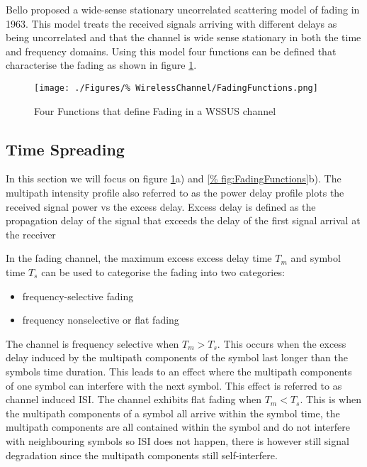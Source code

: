 Bello \cite{Bello63} proposed a wide-sense %
stationary uncorrelated scattering model of fading in %
1963. This model treats the received signals arriving %
with different delays as being uncorrelated and that %
the channel is wide sense stationary in both the time %
and frequency domains. Using this model four functions %
can be defined that characterise the fading as shown in %
figure \ref{fig:FadingFunctions}.
\begin{figure}[ht]
	\centering
	\texttt{[image: ./Figures/\%
		WirelessChannel/FadingFunctions.png]}
	\caption{Four Functions that define Fading in %
			a WSSUS channel %
		   }
	\label{fig:FadingFunctions}
\end{figure}

\FloatBarrier
\subsection{Time Spreading}
In this section we will focus on figure %
\ref{fig:FadingFunctions}a) and \ref{%
fig:FadingFunctions}b). The multipath %
intensity profile also referred to as the %
power delay profile plots the received %
signal power vs the excess delay. %
Excess delay is defined as the propagation %
delay of the signal that exceeds the delay %
of the first signal arrival at the receiver %

In the fading channel, the maximum excess %
excess delay time $T_{m}$ and symbol time %
$T_{s}$ can be used to categorise the %
fading into two categories:
\begin{itemize}
	\item{frequency-selective fading}
	\item{frequency nonselective or flat fading}
\end{itemize}
The channel is frequency selective when %
$T_{m} > T_{s}$. This occurs when the %
excess delay induced by the multipath %
components of the symbol last longer %
than the symbols time duration. This leads %
to an effect where the multipath components %
of one symbol can interfere with the next symbol. %
This effect is referred to as channel induced ISI. The %
channel exhibits flat fading when %
$T_{m} < T_{s}$. This is when %
the multipath components of a symbol %
all arrive within the symbol time, the multipath %
components are all contained within the symbol and %
do not interfere with neighbouring symbols so ISI %
does not happen, there is however still signal %
degradation since the multipath components still %
self-interfere.

